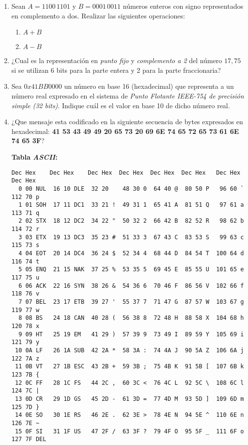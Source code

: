 \documentclass[12pt]{article}
\begin{document}
\begin{enumerate}

    \item Sean $A=1100\,1101$ y $B=0001\,0011$ números enteros con signo
        representados en complemento a dos. Realizar las siguientes
        operaciones:

        \begin{enumerate}

            \item $A+B$

            \item $A-B$

        \end{enumerate}

    \item ¿Cual es la representación en \emph{punto fijo} y \emph{complemento
        a 2} del número $17,75$ si se utilizan 6 bits para la parte entera y 2
        para la parte fraccionaria?

    \item Sea $0x41BB0000$ un número en base 16 (hexadecimal) que representa a
        un número real expresado en el sistema de \emph{Punto Flotante
        IEEE-754 de precisión simple (32 bits)}. Indique cuál es el valor en
        base 10 de dicho número real.

    \item ¿Que mensaje esta codificado en la siguiente secuencia de bytes
        expresados en hexadecimal: \textbf{41 53 43 49 49 20 65 73  20 69 6E
        74 65 72 65 73 61 6E 74 65 3F}?

\textbf{Tabla \emph{ASCII}:}

\begin{verbatim}
Dec Hex    Dec Hex    Dec Hex  Dec Hex  Dec Hex  Dec Hex   Dec Hex   Dec Hex  
  0 00 NUL  16 10 DLE  32 20    48 30 0  64 40 @  80 50 P   96 60 `  112 70 p
  1 01 SOH  17 11 DC1  33 21 !  49 31 1  65 41 A  81 51 Q   97 61 a  113 71 q
  2 02 STX  18 12 DC2  34 22 "  50 32 2  66 42 B  82 52 R   98 62 b  114 72 r
  3 03 ETX  19 13 DC3  35 23 #  51 33 3  67 43 C  83 53 S   99 63 c  115 73 s
  4 04 EOT  20 14 DC4  36 24 $  52 34 4  68 44 D  84 54 T  100 64 d  116 74 t
  5 05 ENQ  21 15 NAK  37 25 %  53 35 5  69 45 E  85 55 U  101 65 e  117 75 u
  6 06 ACK  22 16 SYN  38 26 &  54 36 6  70 46 F  86 56 V  102 66 f  118 76 v
  7 07 BEL  23 17 ETB  39 27 '  55 37 7  71 47 G  87 57 W  103 67 g  119 77 w
  8 08 BS   24 18 CAN  40 28 (  56 38 8  72 48 H  88 58 X  104 68 h  120 78 x
  9 09 HT   25 19 EM   41 29 )  57 39 9  73 49 I  89 59 Y  105 69 i  121 79 y
 10 0A LF   26 1A SUB  42 2A *  58 3A :  74 4A J  90 5A Z  106 6A j  122 7A z
 11 0B VT   27 1B ESC  43 2B +  59 3B ;  75 4B K  91 5B [  107 6B k  123 7B {
 12 0C FF   28 1C FS   44 2C ,  60 3C <  76 4C L  92 5C \  108 6C l  124 7C |
 13 0D CR   29 1D GS   45 2D -  61 3D =  77 4D M  93 5D ]  109 6D m  125 7D }
 14 0E SO   30 1E RS   46 2E .  62 3E >  78 4E N  94 5E ^  110 6E n  126 7E ~
 15 0F SI   31 1F US   47 2F /  63 3F ?  79 4F O  95 5F _  111 6F o  127 7F DEL
\end{verbatim}


\end{enumerate}
\end{document}
